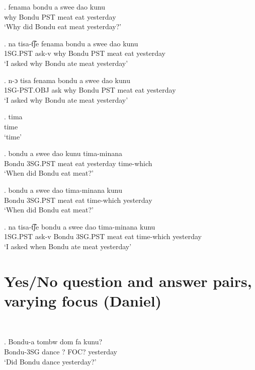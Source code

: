 \documentclass{assets/fieldnotes}
\begin{document}
{
    

\exg. fenama bondu a swee dao kunu\\
why Bondu PST meat eat yesterday\\
    `Why did Bondu eat meat yesterday?'

\exg. na tisa-t͡ʃe fenama bondu a swee dao kunu\\
1SG.PST ask-v why Bondu PST meat eat yesterday\\
    `I asked why Bondu ate meat yesterday' 

\exg. n-ɔ tisa fenama bondu a swee dao kunu\\
1SG-PST.OBJ ask why Bondu PST meat eat yesterday\\
    `I asked why Bondu ate meat yesterday' 

\exg. tima\\
time\\
    `time'

\exg. bondu a swee dao kunu tima-minana\\
Bondu 3SG.PST meat eat yesterday time-which\\
    `When did Bondu eat meat?'

\exg. bondu a swee dao tima-minana kunu\\
Bondu 3SG.PST meat eat time-which yesterday\\
    `When did Bondu eat meat?'


\exg. na tisa-t͡ʃe bondu a swee dao tima-minana kunu\\
1SG.PST ask-v Bondu 3SG.PST meat eat time-which yesterday\\
    `I asked when Bondu ate meat yesterday'

    
\section{Yes/No question and answer pairs, varying focus (Daniel)}
  \\


\exg. Bondu-a tombw dom fa kunu?\\
Bondu-3SG dance ? FOC? yesterday\\
`Did Bondu dance yesterday?'


}
\end{document}
